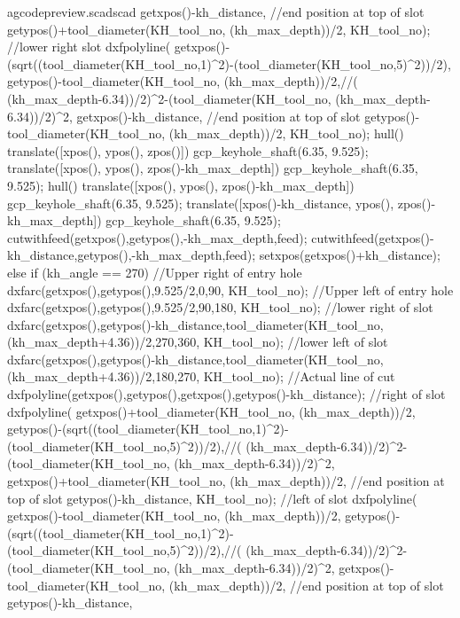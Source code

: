 \documentclass{ltxdoc}
\begin{document}
\begin{writecode}{a}{gcodepreview.scad}{scad}
{        getxpos()-kh_distance,
    //end position at top of slot
        getypos()+tool_diameter(KH_tool_no, (kh_max_depth))/2, 
        KH_tool_no);
    //lower right slot
    dxfpolyline(
        getxpos()-(sqrt((tool_diameter(KH_tool_no,1)^2)-(tool_diameter(KH_tool_no,5)^2))/2), 
        getypos()-tool_diameter(KH_tool_no, (kh_max_depth))/2,//( (kh_max_depth-6.34))/2)^2-(tool_diameter(KH_tool_no, (kh_max_depth-6.34))/2)^2,
        getxpos()-kh_distance,
    //end position at top of slot
        getypos()-tool_diameter(KH_tool_no, (kh_max_depth))/2, 
        KH_tool_no);
    hull(){
      translate([xpos(), ypos(), zpos()]){
        gcp_keyhole_shaft(6.35, 9.525);
      }
      translate([xpos(), ypos(), zpos()-kh_max_depth]){
        gcp_keyhole_shaft(6.35, 9.525);
      }
    }
    hull(){
      translate([xpos(), ypos(), zpos()-kh_max_depth]){
        gcp_keyhole_shaft(6.35, 9.525);
      }
      translate([xpos()-kh_distance, ypos(), zpos()-kh_max_depth]){
        gcp_keyhole_shaft(6.35, 9.525);
      }
    }
    cutwithfeed(getxpos(),getypos(),-kh_max_depth,feed);
    cutwithfeed(getxpos()-kh_distance,getypos(),-kh_max_depth,feed);
    setxpos(getxpos()+kh_distance);
  } else if (kh_angle == 270) {
    //Upper right of entry hole
    dxfarc(getxpos(),getypos(),9.525/2,0,90, KH_tool_no);
    //Upper left of entry hole
    dxfarc(getxpos(),getypos(),9.525/2,90,180, KH_tool_no);
    //lower right of slot
    dxfarc(getxpos(),getypos()-kh_distance,tool_diameter(KH_tool_no, (kh_max_depth+4.36))/2,270,360, KH_tool_no);
    //lower left of slot
    dxfarc(getxpos(),getypos()-kh_distance,tool_diameter(KH_tool_no, (kh_max_depth+4.36))/2,180,270, KH_tool_no);
    //Actual line of cut
    dxfpolyline(getxpos(),getypos(),getxpos(),getypos()-kh_distance);
    //right of slot
    dxfpolyline(
        getxpos()+tool_diameter(KH_tool_no, (kh_max_depth))/2, 
        getypos()-(sqrt((tool_diameter(KH_tool_no,1)^2)-(tool_diameter(KH_tool_no,5)^2))/2),//( (kh_max_depth-6.34))/2)^2-(tool_diameter(KH_tool_no, (kh_max_depth-6.34))/2)^2,
        getxpos()+tool_diameter(KH_tool_no, (kh_max_depth))/2,
    //end position at top of slot
        getypos()-kh_distance, 
        KH_tool_no);
    //left of slot
    dxfpolyline(
        getxpos()-tool_diameter(KH_tool_no, (kh_max_depth))/2, 
        getypos()-(sqrt((tool_diameter(KH_tool_no,1)^2)-(tool_diameter(KH_tool_no,5)^2))/2),//( (kh_max_depth-6.34))/2)^2-(tool_diameter(KH_tool_no, (kh_max_depth-6.34))/2)^2,
        getxpos()-tool_diameter(KH_tool_no, (kh_max_depth))/2,
    //end position at top of slot
        getypos()-kh_distance, 
}
\end{writecode}
\end{document}

